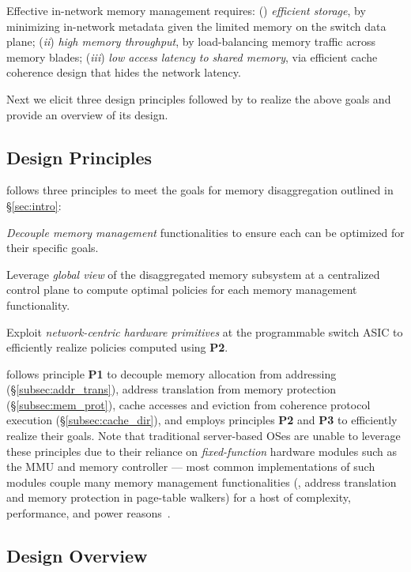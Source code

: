 Effective in-network memory management requires: () \emph{efficient storage}, by  minimizing in-network metadata given the limited memory on the switch data plane;  (\textit{ii}) \emph{high memory throughput}, by load-balancing memory traffic across memory blades; (\textit{iii}) \emph{low access latency to shared memory}, via efficient cache coherence design that hides the network latency.

Next we elicit  three design principles followed by \mind to realize the above goals and provide an overview of its design.

\subsection{Design Principles}
\label{ssec:principles}

\mind follows three principles to meet the goals for memory disaggregation outlined in \S\ref{sec:intro}:

 \textit{Decouple memory management} functionalities to ensure each can be optimized for their specific goals.

 Leverage \textit{global view} of the disaggregated memory subsystem at a centralized control plane to compute optimal policies for each memory management functionality.

 Exploit \textit{network-centric hardware primitives} at the programmable switch ASIC to efficiently realize policies computed using \textbf{P2}.

\vspace{0.075in}\noindent

\mind follows principle \textbf{P1} to decouple memory allocation from addressing (\S\ref{subsec:addr_trans}), address translation from memory protection (\S\ref{subsec:mem_prot}),  cache accesses and eviction from coherence protocol execution (\S\ref{subsec:cache_dir}),  and employs principles \textbf{P2} and \textbf{P3} to efficiently realize their goals. Note that traditional server-based OSes are unable to leverage these principles due to  their reliance on \textit{fixed-function} hardware modules such as the MMU and memory controller --- most common implementations of such modules couple many memory management functionalities (\eg, address translation and memory protection in page-table walkers) for a host of complexity, performance, and power reasons~\cite{vmbook, seesaw, rmmlite}.

\subsection{Design Overview}
\label{ssec:design}

